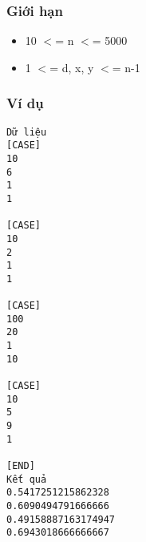 \subsubsection{   Giới hạn  }
\begin{itemize}
	\item     10 $<$= n $<$= 5000   
	\item     1 $<$= d, x, y $<$= n-1   
\end{itemize}

\subsubsection{   Ví dụ  }
\begin{verbatim}
Dữ liệu
[CASE]
10
6
1
1

[CASE]
10
2
1
1

[CASE]
100
20
1
10

[CASE]
10
5
9
1

[END]
Kết quả
0.5417251215862328
0.6090494791666666
0.49158887163174947
0.6943018666666667
\end{verbatim}